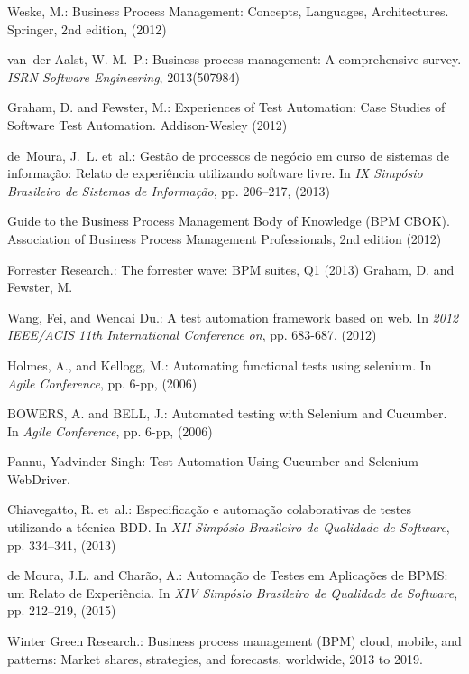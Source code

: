 \documentclass[runningheads,a4paper]{llncs}
\begin{document}
\begin{thebibliography}{4}

Weske, M.: Business Process Management: Concepts, Languages, Architectures. Springer, 2nd edition, (2012)

van~der Aalst, W. M.~P.: Business process management: A comprehensive survey. {\em ISRN Software Engineering}, 2013(507984)

Graham, D. and Fewster, M.: Experiences of Test Automation: Case Studies of Software Test Automation. Addison-Wesley (2012)

de~Moura, J.~L. et~al.: Gestão de processos de negócio em curso de sistemas de
  informação: Relato de experiência utilizando software livre. In {\em IX Simpósio Brasileiro de Sistemas de Informação}, pp.
  206--217, (2013)

 Guide to the Business Process Management Body of Knowledge (BPM
  CBOK). Association of Business Process Management Professionals, 2nd
  edition (2012)

Forrester Research.: The forrester wave: {BPM} suites, {Q1} (2013)
Graham, D. and Fewster, M.

Wang, Fei, and Wencai Du.: A test automation framework based on web. In {\em 2012 IEEE/ACIS 11th International Conference on}, pp. 683-687, (2012)

Holmes, A., and Kellogg, M.: Automating functional tests using selenium. In {\em Agile Conference}, pp. 6-pp, (2006)

BOWERS, A. and BELL, J.: Automated testing with Selenium and Cucumber. In {\em Agile Conference}, pp. 6-pp, (2006)

Pannu, Yadvinder Singh: Test Automation Using Cucumber and Selenium WebDriver. 

Chiavegatto, R. et~al.: Especificação e automação colaborativas de testes utilizando a técnica {BDD}. In {\em XII Simpósio Brasileiro de Qualidade de Software}, pp. 334--341, (2013)

de Moura, J.L. and Charão, A.: Automação de Testes em Aplicações de BPMS: um Relato de Experiência. In {\em XIV Simpósio Brasileiro de Qualidade de Software}, pp.
  212--219, (2015)

Winter Green Research.: Business process management (BPM) cloud, mobile, and patterns: Market shares, strategies, and forecasts, worldwide, 2013 to 2019.


\end{thebibliography}
\end{document}
